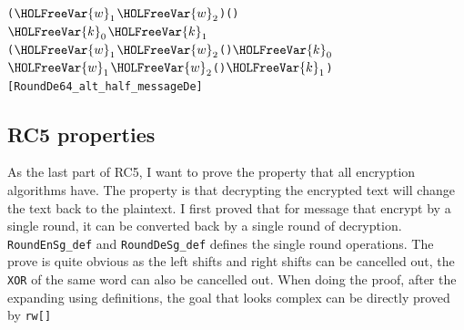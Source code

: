 \documentclass{article}
\begin{document}
\begin{alltt}
\HOLTokenTurnstile{} (\ensuremath{\HOLFreeVar{w}\sb{\mathrm{1}}}\HOLSymConst{,}\ensuremath{\HOLFreeVar{w}\sb{\mathrm{2}}}) \HOLSymConst{=}   \HOLSymConst{\HOLTokenConj{}} (\HOLSymConst{,}\HOLSymConst{,}\HOLSymConst{,}\HOLSymConst{,}\HOLSymConst{,}) \HOLSymConst{=}    \HOLSymConst{\HOLTokenConj{}}
   \ensuremath{\HOLFreeVar{k}\sb{\mathrm{0}}} \HOLSymConst{=}    \HOLSymConst{\HOLTokenConj{}} \ensuremath{\HOLFreeVar{k}\sb{\mathrm{1}}} \HOLSymConst{=}    \HOLSymConst{\HOLTokenImp{}}
       \HOLSymConst{=}
     ( \ensuremath{\HOLFreeVar{w}\sb{\mathrm{1}}} \ensuremath{\HOLFreeVar{w}\sb{\mathrm{2}}}  ( \HOLSymConst{\HOLTokenProd{}}  \HOLSymConst{\ensuremath{+}} ) \HOLSymConst{\ensuremath{-}} \ensuremath{\HOLFreeVar{k}\sb{\mathrm{0}}}\HOLSymConst{,}
       \ensuremath{\HOLFreeVar{w}\sb{\mathrm{1}}} \ensuremath{\HOLFreeVar{w}\sb{\mathrm{2}}}  ( \HOLSymConst{\HOLTokenProd{}} ) \HOLSymConst{\ensuremath{-}} \ensuremath{\HOLFreeVar{k}\sb{\mathrm{1}}})\hfill{[RoundDe64_alt_half_messageDe]}
\end{alltt}

\subsection{RC5 properties}
As the last part of RC5, I want to prove the property that all encryption algorithms have. The property is that
decrypting the encrypted text will change the text back to the plaintext. I first proved that for message that
encrypt by a single round, it can be converted back by a single round of decryption. \verb|RoundEnSg_def| and
\verb|RoundDeSg_def| defines the single round operations. The prove is quite obvious as the left shifts and right shifts
can be cancelled out, the \verb|XOR| of the same word can also be cancelled out. When doing the proof, after the expanding using
definitions, the goal that looks complex can be directly proved by \verb|rw[]|
\end{document}
